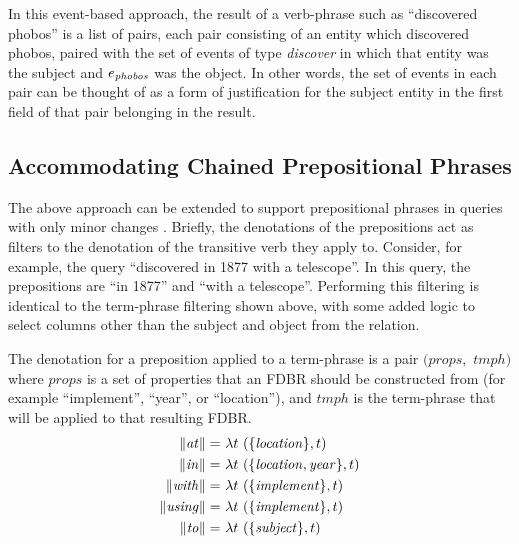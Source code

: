 \documentclass[../main.tex]{subfiles}
\begin{document}
\begin{refsection}
In this event-based approach, the result of a verb-phrase such as ``discovered phobos'' is a list
of pairs, each pair consisting of an entity which discovered phobos, paired with the set of events of
type {\em discover} in which that entity was the subject and $e_{\mathit{phobos}}$ was the object.
In other words, the set of events in each pair can be thought of as a form of justification for the subject entity in the first field of that pair belonging in the result.

\subsection{Accommodating Chained Prepositional Phrases}

The above approach can be extended to support prepositional phrases in queries with only minor changes \cite{peelar2016accommodating, frost2013event}. Briefly, the denotations of the prepositions act as filters to the denotation of the transitive verb they apply to.  Consider, for example, the query ``discovered in 1877 with a telescope''.  In this query, the prepositions are ``in 1877'' and ``with a telescope''.  Performing this filtering is identical to the term-phrase filtering shown above, with some added logic to select columns other than the subject and object from the relation.

The denotation for a preposition applied to a term-phrase is a pair  $(\mathit{props},$ $\mathit{tmph})$ where $\mathit{props}$ is a set of properties that an FDBR should be constructed from (for example ``implement'', ``year'', or ``location''), and $\mathit{tmph}$ is the term-phrase that will be applied to that resulting FDBR.
\begin{equation*}
	\begin{split}
		\meaningof{\mathit{at}} =&\ \lambda t\ (\{\mathit{location}\}, t) \\
		\meaningof{\mathit{in}} =&\ \lambda t\ (\{{\mathit{location}}, {\mathit{year}}\}, t) \\
		\meaningof{\mathit{with}} =&\ \lambda t\ (\{\mathit{implement}\}, t) \\
		\meaningof{\mathit{using}} =&\ \lambda t\ (\{\mathit{implement}\}, t) \\
		\meaningof{\mathit{to}} =&\ \lambda t\ (\{\mathit{subject}\}, t)
	\end{split}
\end{equation*}


\end{refsection}
\end{document}
